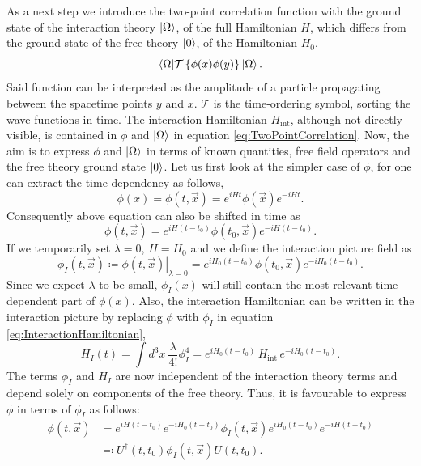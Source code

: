 As a next step we introduce the two-point correlation function with the ground state of the interaction theory $\ket{\Omega}$, \ie of the full Hamiltonian $H$, which differs from the ground state of the free theory $\ket{0}$, \ie of the Hamiltonian $H_0$,
\begin{equation}\label{eq:TwoPointCorrelation}
 \braket{\Omega | \mathcal{T} \left\{\phi(x)\phi(y)\right\} | \Omega}.
\end{equation}
Said function can be interpreted as the amplitude of a particle propagating between the spacetime points $y$ and $x$. $\mathcal{T}$ is the time-ordering symbol, sorting the wave functions in time. The interaction Hamiltonian $H_{\text{int}}$, although not directly visible, is contained in $\phi$ and $\ket{\Omega}$ in equation \ref{eq:TwoPointCorrelation}. Now, the aim is to express $\phi$ and $\ket{\Omega}$ in terms of known quantities, \ie free field operators and the free theory ground state $\ket{0}$. Let us first look at the simpler case of $\phi$, for one can extract the time dependency as follows,
\begin{equation}
 \phi(x) = \phi(t,\vec{x}) = e^{iHt} \phi(\vec{x}) e^{-iHt}.
\end{equation}
Consequently above equation can also be shifted in time as
\begin{equation}
 \phi(t,\vec{x}) = e^{iH(t-t_0)} \phi(t_0,\vec{x}) e^{-iH(t-t_0)}.
\end{equation}
If we temporarily set $\lambda = 0$, $H = H_0$ and we define the interaction picture field as
\begin{equation}
 \phi_I(t,\vec{x}) \coloneqq \left. \phi(t,\vec{x})\right|_{\lambda = 0} = e^{iH_0(t-t_0)} \phi(t_0,\vec{x}) e^{-iH_0(t-t_0)}.
\end{equation}
Since we expect $\lambda$ to be small, $\phi_I(x)$ will still contain the most relevant time dependent part of $\phi(x)$. Also, the interaction Hamiltonian can be written in the interaction picture by replacing $\phi$ with $\phi_I$ in equation \ref{eq:InteractionHamiltonian},
\begin{equation} %
 H_I(t) = \int d^3x \ \frac{\lambda}{4!}\phi_I^4 = e^{iH_0(t-t_0)} \, H_{\text{int}} \, e^{-iH_0(t-t_0)}.
\end{equation}
The terms $\phi_I$ and $H_I$ are now independent of the interaction theory terms and depend solely on components of the free theory. Thus, it is favourable to express $\phi$ in terms of $\phi_I$ as follows:
\begin{align}\label{eq:PhiInteraction}
 \phi(t,\vec{x}) &= e^{iH(t-t_0)}e^{-iH_0(t-t_0)} \phi_I(t,\vec{x}) e^{iH_0(t-t_0)}e^{-iH(t-t_0)} \\ \nonumber 
 &\eqqcolon U^{\dagger}(t,t_0)\phi_I(t,\vec{x})U(t,t_0).
\end{align}
